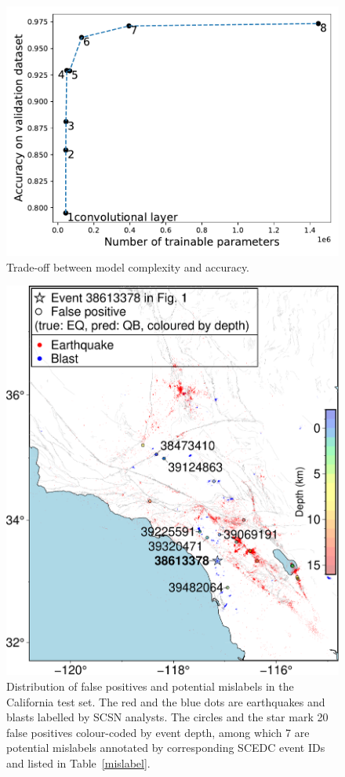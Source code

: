 \documentclass[12pt]{article}
\begin{document}
\begin{figure}
	\centering
	\includegraphics[width=.5\textwidth]{tradeoff.pdf}
	\caption{Trade-off between model complexity and accuracy.}
\end{figure}

\begin{figure}
	\centering
	\includegraphics[width=.98\textwidth]{false_positive.pdf}
	\caption{Distribution of false positives and potential mislabels in the California test set. The red and the blue dots are earthquakes and blasts labelled by SCSN analysts. The circles and the star mark 20 false positives colour-coded by event depth, among which 7 are potential mislabels annotated by corresponding SCEDC event IDs and listed in Table~\ref{mislabel}.}
        \label{false_blast}
\end{figure}
\end{document}
